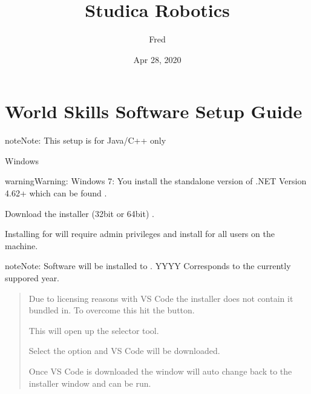 \documentclass[letterpaper,10pt,english]{sphinxmanual}
\title{Studica Robotics}
\date{Apr 28, 2020}
\author{Fred}
\begin{document}
\pagestyle{empty}
\sphinxmaketitle
\pagestyle{plain}
\sphinxtableofcontents
\pagestyle{normal}
\label{\detokenize{index::doc}}



\chapter{World Skills Software Setup Guide}
\label{\detokenize{docs/WorldSkills/setup:world-skills-software-setup-guide}}\label{\detokenize{docs/WorldSkills/setup::doc}}
\begin{sphinxadmonition}{note}{Note:}
This setup is for Java/C++ only
\end{sphinxadmonition}

Windows


\begin{sphinxadmonition}{warning}{Warning:}
Windows 7: You  install the standalone version of .NET Version 4.62+ which can be found .
\end{sphinxadmonition}

Download the installer (32bit or 64bit) .

\noindent{}

Installing for  will require admin privileges and install for all users on the machine.

\begin{sphinxadmonition}{note}{Note:}
Software will be installed to . YYYY Corresponds to the currently suppored year.
\end{sphinxadmonition}

\begin{quote}

Due to licensing reasons with VS Code the installer does not contain it bundled in. To overcome this hit the  button.

\noindent{}

This will open up the selector tool.

\noindent{}

Select the  option and VS Code will be downloaded.

\noindent{}

Once VS Code is downloaded the window will auto change back to the installer window and  can be run.

\noindent{}
\end{quote}
\end{document}
